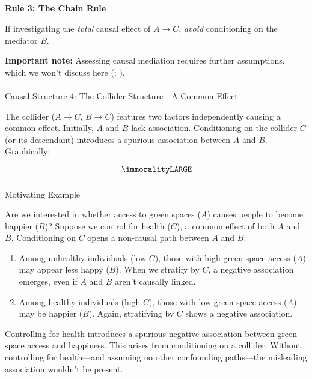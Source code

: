 \documentclass[
  singlecolumn]{article}
\makeatletter
\let\oldparagraph\paragraph
\renewcommand{\paragraph}{
    \@ifstar
      \xxxParagraphStar
      \xxxParagraphNoStar
  }
\newcommand{\xxxParagraphStar}[1]{\oldparagraph*{#1}\mbox{}}
\newcommand{\xxxParagraphNoStar}[1]{\oldparagraph{#1}\mbox{}}
\let\oldsubparagraph\subparagraph
\renewcommand{\subparagraph}{
    \@ifstar
      \xxxSubParagraphStar
      \xxxSubParagraphNoStar
  }
\newcommand{\xxxSubParagraphStar}[1]{\oldsubparagraph*{#1}\mbox{}}
\newcommand{\xxxSubParagraphNoStar}[1]{\oldsubparagraph{#1}\mbox{}}
\makeatother
\begin{document}
\subparagraph{\texorpdfstring{\textbf{Rule 3: The Chain
Rule}}{Rule 3: The Chain Rule}}\label{rule-3-the-chain-rule}

If investigating the \emph{total} causal effect of \(A \to C\),
\emph{avoid} conditioning on the mediator \(B\).

\textbf{Important note:} Assessing causal mediation requires further
assumptions, which we won't discuss here
(;
).

\paragraph{Causal Structure 4: The Collider Structure---A Common
Effect}\label{causal-structure-4-the-collider-structurea-common-effect}

The collider (\(A \to C\), \(B \to C\)) features two factors
independently causing a common effect. Initially, \(A\) and \(B\) lack
association. Conditioning on the collider \(C\) (or its descendant)
introduces a spurious association between \(A\) and \(B\). Graphically:

\[
\immoralityLARGE
\]

\subparagraph{Motivating Example}\label{motivating-example-3}

Are we interested in whether access to green spaces (\(A\)) causes
people to become happier (\(B\))? Suppose we control for health (\(C\)),
a common effect of both \(A\) and \(B\). Conditioning on \(C\) opens a
non-causal path between \(A\) and \(B\):

\begin{enumerate}
\def\labelenumi{\arabic{enumi}.}
\item
  Among unhealthy individuals (low \(C\)), those with high green space
  access (\(A\)) may appear less happy (\(B\)). When we stratify by
  \(C\), a negative association emerges, even if \(A\) and \(B\) aren't
  causally linked.
\item
  Among healthy individuals (high \(C\)), those with low green space
  access (\(A\)) may be happier (\(B\)). Again, stratifying by \(C\)
  shows a negative association.
\end{enumerate}

Controlling for health introduces a spurious negative association
between green space access and happiness. This arises from conditioning
on a collider. Without controlling for health---and assuming no other
confounding paths---the misleading association wouldn't be present.
\end{document}
